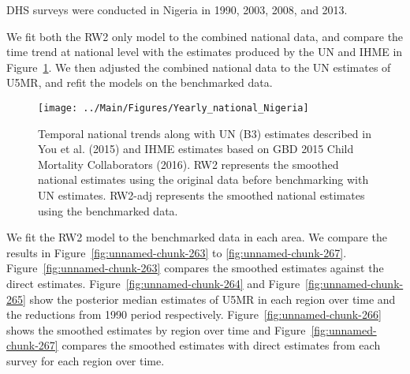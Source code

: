 \documentclass[12pt]{article}\usepackage[]{graphicx}\usepackage[]{color}
\newenvironment{knitrout}{}{} %
\begin{document}


DHS surveys were conducted in Nigeria in 1990, 2003, 2008, and 2013.

We fit both the RW2 only model to the combined national data, and compare the time trend at national level with the estimates produced by the UN and IHME in Figure~\ref{fig:unnamed-chunk-262}. We then adjusted the combined national data to the UN estimates of U5MR, and refit the models on the benchmarked data. 

\begin{knitrout}
\color{fgcolor}\begin{figure}[bht]

{\centering \texttt{[image: ../Main/Figures/Yearly\_national\_Nigeria]} 

}

\caption[Temporal national trends along with UN (B3) estimates described in You et al]{Temporal national trends along with UN (B3) estimates described in You et al. (2015) and IHME estimates based on GBD 2015 Child Mortality Collaborators (2016). RW2 represents the smoothed national estimates using the original data before benchmarking with UN estimates. RW2-adj represents the smoothed national estimates using the benchmarked data.}\label{fig:unnamed-chunk-262}
\end{figure}


\end{knitrout}
 

We fit the RW2 model to the benchmarked data in each area. 
We compare the results in Figure~\ref{fig:unnamed-chunk-263} to \ref{fig:unnamed-chunk-267}.
Figure~\ref{fig:unnamed-chunk-263} compares the smoothed estimates against the direct estimates. Figure~\ref{fig:unnamed-chunk-264} and Figure~\ref{fig:unnamed-chunk-265} show the posterior median estimates of U5MR in each region over time and the reductions from 1990 period respectively.
Figure~\ref{fig:unnamed-chunk-266} shows the smoothed estimates by region over time and Figure~\ref{fig:unnamed-chunk-267} compares the smoothed estimates with direct estimates from each survey for each region over time.


\end{document}
